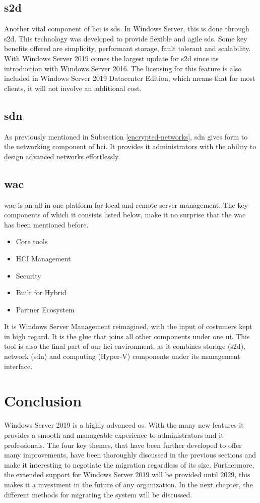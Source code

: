 \subsection{\acrfull{s2d}}
Another vital component of \acrshort{hci} is \acrfull{sds}. In Windows Server, this is done through \acrshort{s2d}. This technology was developed to provide flexible and agile \acrshort{sds}. Some key benefits offered are simplicity, performant storage, fault tolerant and scalability. With Windows Server 2019 comes the largest update for \acrshort{s2d} since its introduction with Windows Server 2016. The licensing for this feature is also included in Windows Server 2019 Datacenter Edition, which means that for most clients, it will not involve an additional cost. \autocite{Gerend2018a}
\subsection{\acrshort{sdn}}
As previously mentioned in Subsection \ref{encrypted-networks}, \acrshort{sdn} gives form to the networking component of \acrshort{hci}. It provides \acrshort{it} administrators with the ability to design advanced networks effortlessly.
\subsection{\acrlong{wac}}
\acrlong{wac} is an all-in-one platform for local and remote server management. The key components of which it consists listed below, make it no surprise that the \acrlong{wac} has been mentioned before. 
\begin{itemize}
	\item Core tools
	\item HCI Management
	\item Security
	\item Built for Hybrid
	\item Partner Ecosystem
\end{itemize}
It is Windows Server Management reimagined, with the input of costumers kept in high regard. It is the glue that joins all other components under one \acrfull{ui}. This tool is also the final part of our \acrshort{hci} environment, as it combines storage (\acrshort{s2d}), network (\acrshort{sdn}) and computing (Hyper-V) components under its management interface. 

\section{Conclusion}

Windows Server 2019 is a highly advanced \acrshort{os}. With the many new features it provides a smooth and manageable experience to administrators and \acrshort{it} professionals. The four key themes, that have been further developed to offer many improvements, have been thoroughly discussed in the previous sections and make it interesting to negotiate the migration regardless of its size. Furthermore, the extended support for Windows Server 2019 will be provided until 2029, this makes it a investment in the future of any organization. In the next chapter, the different methods for migrating the system will be discussed.
